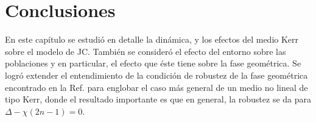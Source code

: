 \section{Conclusiones}
En este capítulo se estudió en detalle la dinámica, y los efectos del medio Kerr sobre el modelo de JC. También se consideró el efecto del entorno sobre las poblaciones y en particular, el efecto que éste tiene sobre la fase geométrica. Se logró extender el entendimiento de la condición de robustez de la fase geométrica encontrado en la Ref. \cite{Viotti2022} para englobar el caso más general de un medio no lineal de tipo Kerr, donde el resultado importante es que en general, la robustez se da para $\Delta-\chi(2n-1)=0$.